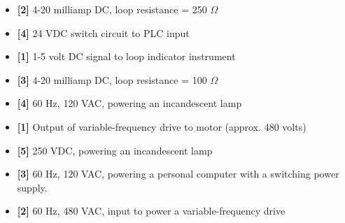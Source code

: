 





\begin{itemize}
\item{} {\bf [2]} 4-20 milliamp DC, loop resistance = 250 $\Omega$
\vskip 5pt 
\item{} {\bf [4]} 24 VDC switch circuit to PLC input
\vskip 5pt 
\item{} {\bf [1]} 1-5 volt DC signal to loop indicator instrument
\vskip 5pt 
\item{} {\bf [3]} 4-20 milliamp DC, loop resistance = 100 $\Omega$
\end{itemize}

\begin{itemize}
\item{} {\bf [4]} 60 Hz, 120 VAC, powering an incandescent lamp
\vskip 5pt 
\item{} {\bf [1]} Output of variable-frequency drive to motor (approx. 480 volts)
\vskip 5pt 
\item{} {\bf [5]} 250 VDC, powering an incandescent lamp
\vskip 5pt 
\item{} {\bf [3]} 60 Hz, 120 VAC, powering a personal computer with a switching power supply.
\vskip 5pt 
\item{} {\bf [2]} 60 Hz, 480 VAC, input to power a variable-frequency drive
\end{itemize}












